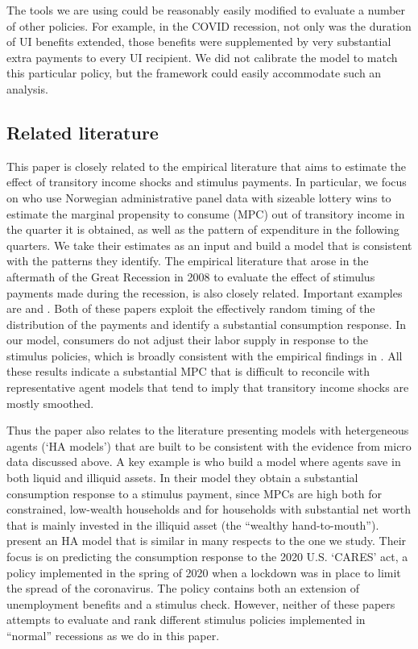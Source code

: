 \documentclass[../HAFiscal]{subfiles}
\begin{document}
The tools we are using could be reasonably easily modified to evaluate a number of other policies.  For example, in the COVID recession, not only was the duration of UI benefits extended, those benefits were supplemented by very substantial extra payments to every UI recipient.  We did not calibrate the model to match this particular policy, but the framework could easily accommodate such an analysis.

\subsection{Related literature}
\label{sec:lit}

This paper is closely related to the empirical literature that aims to estimate the effect of transitory income shocks and stimulus payments. In particular, we focus on \cite{fagereng_mpc_2021} who use Norwegian administrative panel data with sizeable lottery wins to estimate the marginal propensity to consume (MPC) out of transitory income in the quarter it is obtained, as well as the pattern of expenditure in the following quarters. We take their estimates as an input and build a model that is consistent with the patterns they identify. The empirical literature that arose in the aftermath of the Great Recession in 2008 to evaluate the effect of stimulus payments made during the recession, is also closely related. Important examples are \cite{parker2013consumer} and \cite{broda2014economic}. Both of these papers exploit the effectively random timing of the distribution of the payments and identify a substantial consumption response. In our model, consumers do not adjust their labor supply in response to the stimulus policies, which is broadly consistent with the empirical findings in \cite{ganong2022spending}. All these results indicate a substantial MPC that is difficult to reconcile with representative agent models that tend to imply that transitory income shocks are mostly smoothed. 

Thus the paper also relates to the literature presenting models with hetergeneous agents (`HA models') that are built to be consistent with the evidence from micro data discussed above. A key example is \cite{kaplan2014model} who build a model where agents save in both liquid and illiquid assets. In their model they obtain a substantial consumption response to a stimulus payment, since MPCs are high both for constrained, low-wealth households and for households with substantial net worth that is mainly invested in the illiquid asset (the ``wealthy hand-to-mouth''). \cite{carroll2020modeling} present an HA model that is similar in many respects to the one we study. Their focus is on predicting the consumption response to the 2020 U.S. `CARES' act, a policy implemented in the spring of 2020 when a lockdown was in place to limit the spread of the coronavirus. The policy contains both an extension of unemployment benefits and a stimulus check. However, neither of these papers attempts to evaluate and rank different stimulus policies implemented in ``normal'' recessions as we do in this paper. 
\end{document}
